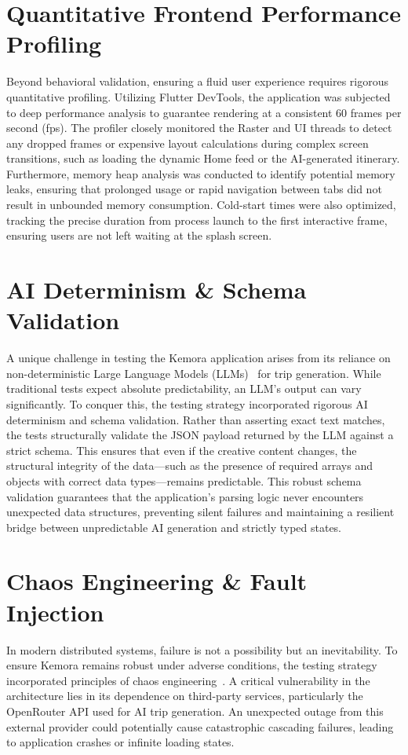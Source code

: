 \section{Quantitative Frontend Performance Profiling}
Beyond behavioral validation, ensuring a fluid user experience requires rigorous quantitative profiling. Utilizing Flutter DevTools, the application was subjected to deep performance analysis to guarantee rendering at a consistent 60 frames per second (fps). The profiler closely monitored the Raster and UI threads to detect any dropped frames or expensive layout calculations during complex screen transitions, such as loading the dynamic Home feed or the AI-generated itinerary. Furthermore, memory heap analysis was conducted to identify potential memory leaks, ensuring that prolonged usage or rapid navigation between tabs did not result in unbounded memory consumption. Cold-start times were also optimized, tracking the precise duration from process launch to the first interactive frame, ensuring users are not left waiting at the splash screen.

\section{AI Determinism \& Schema Validation}
A unique challenge in testing the Kemora application arises from its reliance on non-deterministic Large Language Models (LLMs)~\cite{llm_overview} for trip generation. While traditional tests expect absolute predictability, an LLM's output can vary significantly. To conquer this, the testing strategy incorporated rigorous AI determinism and schema validation. Rather than asserting exact text matches, the tests structurally validate the JSON payload returned by the LLM against a strict schema. This ensures that even if the creative content changes, the structural integrity of the data---such as the presence of required arrays and objects with correct data types---remains predictable. This robust schema validation guarantees that the application's parsing logic never encounters unexpected data structures, preventing silent failures and maintaining a resilient bridge between unpredictable AI generation and strictly typed states.

\section{Chaos Engineering \& Fault Injection}
In modern distributed systems, failure is not a possibility but an inevitability. To ensure Kemora remains robust under adverse conditions, the testing strategy incorporated principles of chaos engineering~\cite{chaos_engineering}. A critical vulnerability in the architecture lies in its dependence on third-party services, particularly the OpenRouter API used for AI trip generation. An unexpected outage from this external provider could potentially cause catastrophic cascading failures, leading to application crashes or infinite loading states.

